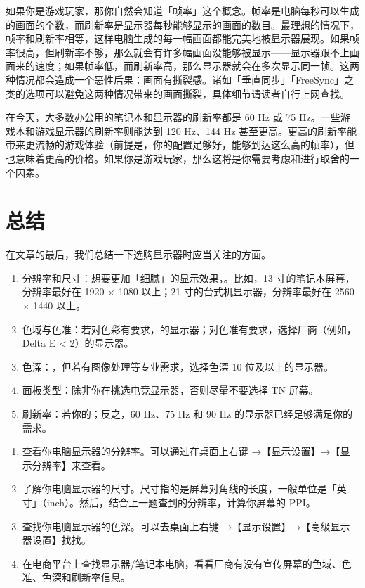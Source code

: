 如果你是游戏玩家，那你自然会知道「帧率」这个概念。帧率是电脑每秒可以生成的画面的个数，而刷新率是显示器每秒能够显示的画面的数目。最理想的情况下，帧率和刷新率相等，这样电脑生成的每一幅画面都能完美地被显示器展现。如果帧率很高，但刷新率不够，那么就会有许多幅画面没能够被显示——显示器跟不上画面来的速度；如果帧率低，而刷新率高，那么显示器就会在多次显示同一帧。这两种情况都会造成一个恶性后果：画面有撕裂感。诸如「垂直同步」「FreeSync」之类的选项可以避免这两种情况带来的画面撕裂，具体细节请读者自行上网查找。

在今天，大多数办公用的笔记本和显示器的刷新率都是 60 Hz 或 75 Hz。一些游戏本和游戏显示器的刷新率则能达到 120 Hz、144 Hz 甚至更高。更高的刷新率能带来更流畅的游戏体验（前提是，你的配置足够好，能够到达这么高的帧率），但也意味着更高的价格。如果你是游戏玩家，那么这将是你需要考虑和进行取舍的一个因素。

\section{总结}

在文章的最后，我们总结一下选购显示器时应当关注的方面。

\begin{enumerate}
  \item 分辨率和尺寸：想要更加「细腻」的显示效果，。比如，13 寸的笔记本屏幕，分辨率最好在 1920 × 1080 以上；21 寸的台式机显示器，分辨率最好在 2560 × 1440 以上。
  \item 色域与色准：若对色彩有要求，的显示器；对色准有要求，选择厂商（例如，Delta E < 2）的显示器。
  \item 色深：，但若有图像处理等专业需求，选择色深 10 位及以上的显示器。
  \item 面板类型：除非你在挑选电竞显示器，否则尽量不要选择 TN 屏幕。
  \item 刷新率：若你的；反之，60 Hz、75 Hz 和 90 Hz 的显示器已经足够满足你的需求。
\end{enumerate}

\practice

\begin{enumerate}
  \item 查看你电脑显示器的分辨率。可以通过在桌面上右键 →【显示设置】→【显示分辨率】来查看。
  \item 了解你电脑显示器的尺寸。尺寸指的是屏幕对角线的长度，一般单位是「英寸」（inch）。然后，结合上一题查到的分辨率，计算你屏幕的 PPI。
  \item 查找你电脑显示器的色深。可以去桌面上右键 →【显示设置】→【高级显示器设置】找找。
  \item 在电商平台上查找显示器/笔记本电脑，看看厂商有没有宣传屏幕的色域、色准、色深和刷新率信息。
\end{enumerate}